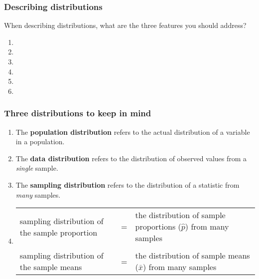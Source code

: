 \begin{frame}
\frametitle{Describing distributions}
\grp
\begin{clicker}{When describing distributions, what are the three features you should address?}
\begin{enumerate}
\item
\item[]
\item
\item[]
\item
\item[]
\end{enumerate}
\end{clicker}
\end{frame}

\begin{frame}
\frametitle{Three distributions to keep in mind}
\begin{enumerate}
 \item   The \textbf{population distribution} refers to the actual distribution of a variable in a population.  \\ \vskip5pt
 \item   The \textbf{data distribution} refers to the distribution of observed values from a \emph{single} sample.  \\ \vskip5pt
 \item     The \textbf{sampling distribution} refers to the distribution of a statistic from \emph{many} samples.\\ \vskip5pt
\item[] \begin{tabular}{p{4.2cm} p{0.2cm} p{4.8cm}}
\small{sampling distribution of the sample proportion} & = & \small{the distribution of sample proportions ($\hat{p}$) from many samples} \\
 & & \\
 \small{sampling distribution of the sample means}  & = &  \small{the distribution of sample means ($\bar{x}$) from many samples}
\end{tabular}
\end{enumerate}
\end{frame}


